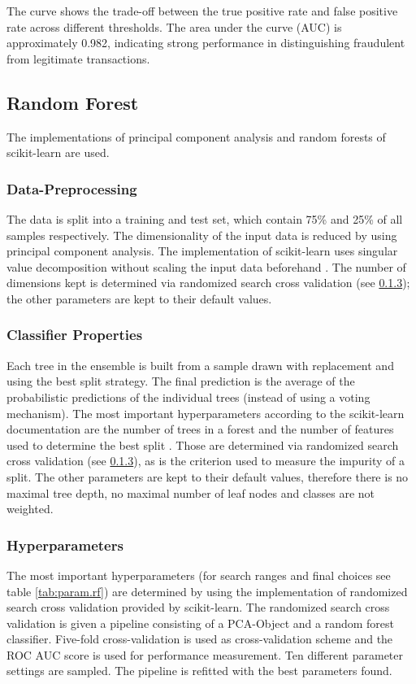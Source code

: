 \documentclass[a4, 10 pt, conference]{ieeeconf}  %
\begin{document}
The curve shows the trade-off between the true positive rate and false positive rate across different thresholds. The area under the curve (AUC) is approximately 0.982, indicating strong performance in distinguishing fraudulent from legitimate transactions.



\subsection{Random Forest}
The implementations of principal component analysis and random forests of scikit-learn are used.
\subsubsection{Data-Preprocessing}
\label{subsubsection:data-processing}
The data is split into a training and test set, which contain 75\% and 25\% of all samples respectively. The dimensionality of the input data is reduced by using principal component analysis. The implementation of scikit-learn uses singular value decomposition without scaling the input data beforehand \cite{sl.pca}. The number of dimensions kept is determined via randomized search cross validation (see \ref{subsubsection:hyperparameters}); the other parameters are kept to their default values.
\subsubsection{Classifier Properties}
\label{subsubsection:classifier-properties}
Each tree in the ensemble is built from a sample drawn with replacement and using the best split strategy. The final prediction is the average of the probabilistic predictions of the individual trees (instead of using a voting mechanism). The most important hyperparameters according to the scikit-learn documentation are the number of trees in a forest and the number of features used to determine the best split \cite{sl.rf}. Those are determined via randomized search cross validation (see \ref{subsubsection:hyperparameters}), as is the criterion used to measure the impurity of a split. The other parameters are kept to their default values, therefore there is no maximal tree depth, no maximal number of leaf nodes and classes are not weighted.
\subsubsection{Hyperparameters}
\label{subsubsection:hyperparameters}
The most important hyperparameters (for search ranges and final choices see table \ref{tab:param.rf}) are determined by using the implementation of randomized search cross validation provided by scikit-learn. The randomized search cross validation is given a pipeline consisting of a PCA-Object and a random forest classifier. Five-fold cross-validation is used as cross-validation scheme and the ROC AUC score is used for performance measurement. Ten different parameter settings are sampled. The pipeline is refitted with the best parameters found.
\end{document}
